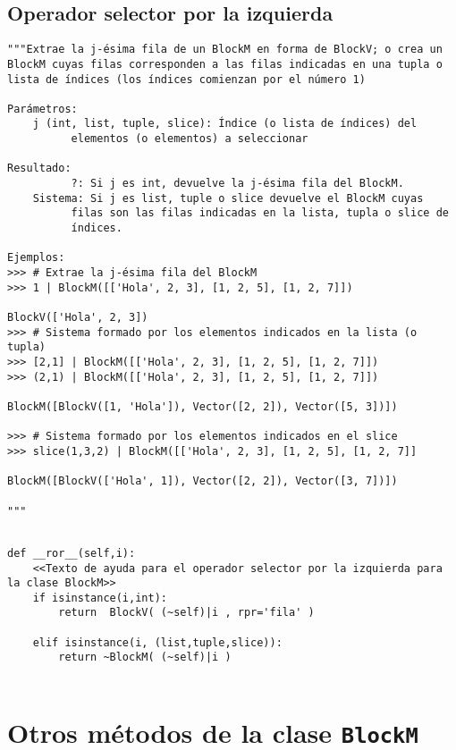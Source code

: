 \documentclass[11pt]{report}
\begin{document}
\subsection{Operador selector por la izquierda}
\label{sec:orge97baf2}

\begin{verbatim}
"""Extrae la j-ésima fila de un BlockM en forma de BlockV; o crea un
BlockM cuyas filas corresponden a las filas indicadas en una tupla o
lista de índices (los índices comienzan por el número 1)

Parámetros:
    j (int, list, tuple, slice): Índice (o lista de índices) del 
          elementos (o elementos) a seleccionar

Resultado:
          ?: Si j es int, devuelve la j-ésima fila del BlockM.
    Sistema: Si j es list, tuple o slice devuelve el BlockM cuyas
          filas son las filas indicadas en la lista, tupla o slice de
          índices.

Ejemplos:
>>> # Extrae la j-ésima fila del BlockM 
>>> 1 | BlockM([['Hola', 2, 3], [1, 2, 5], [1, 2, 7]])

BlockV(['Hola', 2, 3])
>>> # Sistema formado por los elementos indicados en la lista (o tupla)
>>> [2,1] | BlockM([['Hola', 2, 3], [1, 2, 5], [1, 2, 7]])
>>> (2,1) | BlockM([['Hola', 2, 3], [1, 2, 5], [1, 2, 7]])

BlockM([BlockV([1, 'Hola']), Vector([2, 2]), Vector([5, 3])])

>>> # Sistema formado por los elementos indicados en el slice
>>> slice(1,3,2) | BlockM([['Hola', 2, 3], [1, 2, 5], [1, 2, 7]]

BlockM([BlockV(['Hola', 1]), Vector([2, 2]), Vector([3, 7])])

"""
\end{verbatim}

\begin{verbatim}

def __ror__(self,i):
    <<Texto de ayuda para el operador selector por la izquierda para la clase BlockM>>
    if isinstance(i,int):
        return  BlockV( (~self)|i , rpr='fila' )

    elif isinstance(i, (list,tuple,slice)):        
        return ~BlockM( (~self)|i ) 
        
\end{verbatim}

\section{Otros métodos de la clase \texttt{BlockM}}
\label{sec:org5ce1e4f}
\end{document}
